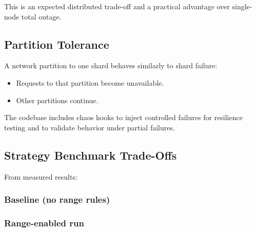 \documentclass[12pt]{article}
\begin{document}
This is an expected distributed trade-off and a practical advantage over single-node total outage.

\subsection{Partition Tolerance}

A network partition to one shard behaves similarly to shard failure:
\begin{itemize}
    \item Requests to that partition become unavailable.
    \item Other partitions continue.
\end{itemize}

The codebase includes chaos hooks to inject controlled failures for resilience testing and to validate behavior under partial failures.

\subsection{Strategy Benchmark Trade-Offs}

From measured results:

\subsubsection*{Baseline (no range rules)}

\begin{table}[H]
\centering
\begin{minipage}{\textwidth}
\centering
{}
\end{minipage}
\end{table}

\subsubsection*{Range-enabled run}
\end{document}

